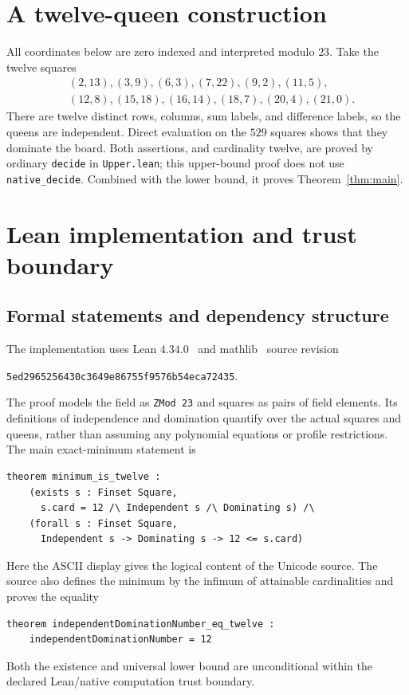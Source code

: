 \documentclass[11pt,a4paper]{article}
\theoremstyle{remark}
\begin{document}
\section{A twelve-queen construction}\label{sec:upper}
All coordinates below are zero indexed and interpreted modulo $23$.
Take the twelve squares
\begin{equation}\label{eq:witness}
\begin{split}
 &(2,13),(3,9),(6,3),(7,22),(9,2),(11,5),\\
 &(12,8),(15,18),(16,14),(18,7),(20,4),(21,0).
\end{split}
\end{equation}
There are twelve distinct rows, columns, sum labels, and difference labels,
so the queens are independent. Direct evaluation on the $529$ squares shows
that they dominate the board. Both assertions, and cardinality twelve, are
proved by ordinary \texttt{decide} in \texttt{Upper.lean}; this upper-bound
proof does not use \texttt{native\_decide}. Combined with the lower bound,
it proves Theorem~\ref{thm:main}.

\section{Lean implementation and trust boundary}\label{sec:lean}
\subsection{Formal statements and dependency structure}
The implementation uses Lean $4.34.0$~\cite{Lean} and mathlib~\cite{mathlib} source revision
\begin{center}
\texttt{5ed2965256430c3649e86755f9576b54eca72435}.
\end{center}
The proof models the field as \texttt{ZMod 23} and squares as pairs of field
elements. Its definitions of independence and domination quantify over the
actual squares and queens, rather than assuming any polynomial equations or
profile restrictions. The main exact-minimum statement is
\begin{lstlisting}
theorem minimum_is_twelve :
    (exists s : Finset Square,
      s.card = 12 /\ Independent s /\ Dominating s) /\
    (forall s : Finset Square,
      Independent s -> Dominating s -> 12 <= s.card)
\end{lstlisting}
Here the ASCII display gives the logical content of the Unicode source.
The source also defines the minimum by the infimum of attainable cardinalities
and proves the equality
\begin{lstlisting}
theorem independentDominationNumber_eq_twelve :
    independentDominationNumber = 12
\end{lstlisting}
Both the existence and universal lower bound are unconditional within the
declared Lean/native computation trust boundary.
\end{document}

